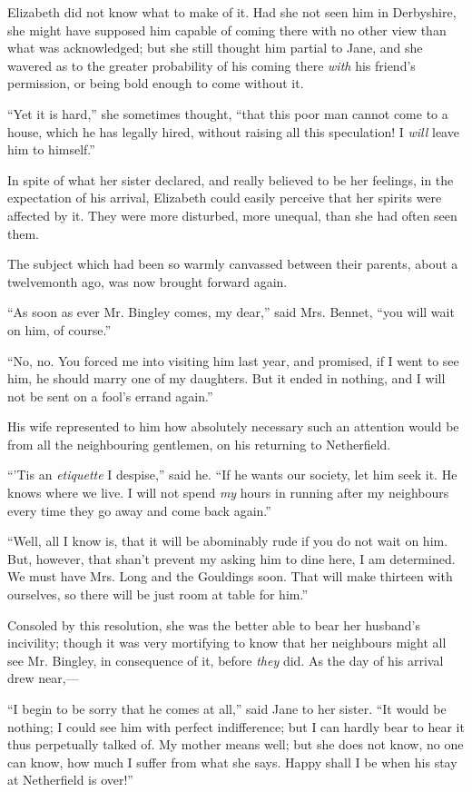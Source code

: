 Elizabeth did not know what to make of it. Had she not seen him in Derbyshire, she might have supposed him capable of coming there with no other view than what was acknowledged; but she still thought him partial to Jane, and she wavered as to the greater probability of his coming there \textit{with} his friend's permission, or being bold enough to come without it.

``Yet it is hard,'' she sometimes thought, ``that this poor man cannot come to a house, which he has legally hired, without raising all this speculation! I \textit{will} leave him to himself.''

In spite of what her sister declared, and really believed to be her feelings, in the expectation of his arrival, Elizabeth could easily perceive that her spirits were affected by it. They were more disturbed, more unequal, than she had often seen them.

The subject which had been so warmly canvassed between their parents, about a twelvemonth ago, was now brought forward again.

``As soon as ever Mr. Bingley comes, my dear,'' said Mrs. Bennet, ``you will wait on him, of course.''

``No, no. You forced me into visiting him last year, and promised, if I went to see him, he should marry one of my daughters. But it ended in nothing, and I will not be sent on a fool's errand again.''

His wife represented to him how absolutely necessary such an attention would be from all the neighbouring gentlemen, on his returning to Netherfield.

``'Tis an \textit{etiquette} I despise,'' said he. ``If he wants our society, let him seek it. He knows where we live. I will not spend \textit{my} hours in running after my neighbours every time they go away and come back again.''

``Well, all I know is, that it will be abominably rude if you do not wait on him. But, however, that shan't prevent my asking him to dine here, I am determined. We must have Mrs. Long and the Gouldings soon. That will make thirteen with ourselves, so there will be just room at table for him.''

Consoled by this resolution, she was the better able to bear her husband's incivility; though it was very mortifying to know that her neighbours might all see Mr. Bingley, in consequence of it, before \textit{they} did. As the day of his arrival drew near,---

``I begin to be sorry that he comes at all,'' said Jane to her sister. ``It would be nothing; I could see him with perfect indifference; but I can hardly bear to hear it thus perpetually talked of. My mother means well; but she does not know, no one can know, how much I suffer from what she says. Happy shall I be when his stay at Netherfield is over!''

